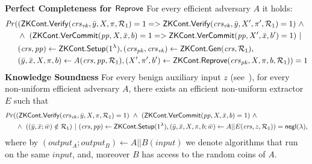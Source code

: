 \begin{definition}[ZK Continuations]
\noindent \textbf{Perfect Completeness for ${\mathsf{Reprove}}$} For every efficient adversary $A$ it holds: 
\begin{align*}
\mathit{Pr} (& (\ZKCont.\Verify(\crsvk, \bar{y}, X, \pi, \relone) = 1  = >  \ZKCont.\Verify(\crsvk, \bar{y}, X', \pi', \relone) = 1)  \ \wedge \  \\
                   & \wedge \ (\ZKCont.\VerifyCom (\pp, X, \barx, b) = 1 => \ZKCont.\VerifyCom (\pp, X', \barx, b') = 1) \ | \\
                   & (\crs, \pp) \leftarrow \ZKCont.\Setup (1^{\lambda}), (\crspk, \crsvk) \leftarrow \ZKCont.\Gen(\crs, \relone), \\ 
                   & (\bary, \barx, X, \pi, b) \leftarrow A(\crs,\pp, \relone), (X', \pi', b') \leftarrow \ZKCont.\Reprove(\crspk, X, \pi, b, \relone)) = 1
\end{align*}
\noindent \textbf{Knowledge Soundness} For every benign auxiliary input $z$ (see~\cite{bening_auxiliary}), 
for every non-uniform efficient adversary $A$, there exists an efficient non-uniform extractor $E$ such that 
\begin{align*}
\mathit{Pr} (& ({\mathsf{ZKCont}}.{\mathsf{Verify}}(\mathit{crs}_{\mathit{vk}}, \bar{y}, X, \pi, \mathcal{R}_1) = 1) \ \wedge \ ({\mathsf{ZKCont}}.{\mathsf{VerCommit}}(\mathit{pp}, X, \bar{x}, b) = 1) \ \wedge\ \\
                   & \wedge \ ( (\bar{y}, \bar{x}; \bar{w}) \notin \mathcal{R}_1) \ | \ (\mathit{crs}, \mathit{pp}) \leftarrow {\ensuremath{\mathsf{ZKCont}}}.{\mathsf{Setup}} (1^{\lambda}), 
                   (\bar{y}, \bar{x}, X, \pi, b; \bar{w} ) \leftarrow A || E (\mathit{crs}, z, \mathcal{R}_1)) = \mathsf{negl} (\lambda),
\end{align*}
\noindent %
where by $(\mathit{output_{A}};\mathit{output_{B}}) \leftarrow A || B(\mathit{input})$ we denote algorithms that run on the same 
$\mathit{input}$, and, moreover $B$ has access to the random coins of $A$. \\


\end{definition}
